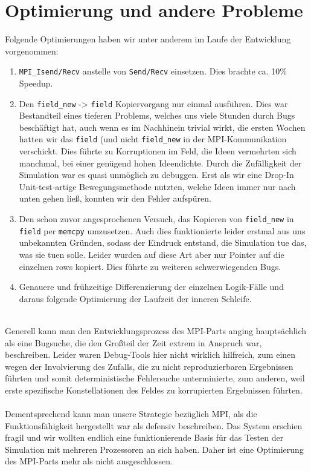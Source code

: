 \section{Optimierung und andere Probleme}
Folgende Optimierungen haben wir unter anderem im Laufe der Entwicklung vorgenommen:
\begin{enumerate}
\item \texttt{MPI\_Isend/Recv} anstelle von \texttt{Send/Recv} einsetzen. 
	Dies brachte ca. 10\% Speedup.
\item Den \texttt{field\_new} -\textgreater{} \texttt{field} Kopiervorgang nur einmal ausführen. 
	Dies war Bestandteil eines tieferen Problems, welches uns viele Stunden durch Bugs beschäftigt hat, auch wenn es im Nachhinein trivial wirkt, die ersten Wochen hatten wir das \texttt{field} (und nicht \texttt{field\_new} in der MPI-Kommunikation verschickt. 
	Dies führte zu Korruptionen im Feld, die Ideen vermehrten sich manchmal, bei einer genügend hohen Ideendichte. 
	Durch die Zufälligkeit der Simulation war es quasi unmöglich zu debuggen.
	Erst als wir eine Drop-In Unit-test-artige Bewegungsmethode nutzten, welche Ideen immer nur nach unten gehen ließ, konnten wir den Fehler aufspüren. 
\item Den schon zuvor angesprochenen Versuch, das Kopieren von \texttt{field\_new} in \texttt{field} per \texttt{memcpy} umzusetzen.
	Auch dies funktionierte leider erstmal aus uns unbekannten Gründen, sodass der Eindruck entstand, die Simulation tue das, was sie tuen solle. 
	Leider wurden auf diese Art aber nur Pointer auf die einzelnen rows kopiert. Dies führte zu weiteren schwerwiegenden Bugs.
	\item Genauere und frühzeitige Differenzierung der einzelnen Logik-Fälle und daraus folgende Optimierung der Laufzeit der inneren Schleife.
\end{enumerate}
\quad \\
Generell kann man den Entwicklungsprozess des MPI-Parts anging hauptsächlich als eine Bugsuche, die den Großteil der Zeit extrem in Anspruch war, beschreiben. 
Leider waren Debug-Tools hier nicht wirklich hilfreich, zum einen wegen der Involvierung des Zufalls, die zu nicht reproduzierbaren Ergebnissen führten und somit deterministische Fehlersuche unterminierte, zum anderen, weil erste spezifische Konstellationen des Feldes zu korrupierten Ergebnissen führten. \\
\quad \\
Dementsprechend kann man unsere Strategie bezüglich MPI, als die Funktionsfähigkeit hergestellt war als defensiv beschreiben.
Das System erschien fragil und wir wollten endlich eine funktionierende Basis für das Testen der Simulation mit mehreren Prozessoren an sich haben. 
Daher ist eine Optimierung des MPI-Parts mehr als nicht ausgeschlossen.

